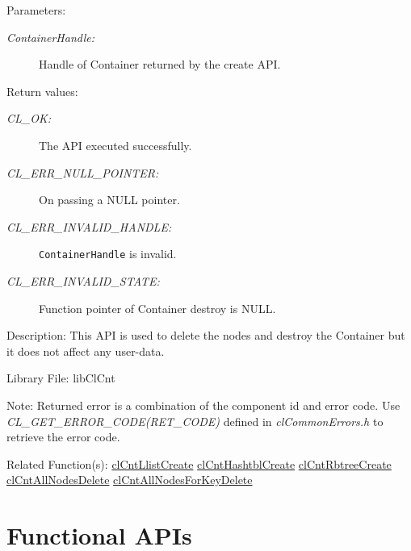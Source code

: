 \begin{Desc}
\item[Parameters:]
\begin{description}
\item[{\em Container\-Handle:}]Handle of Container returned by the create API.\end{description}
\end{Desc}
\begin{Desc}
\item[Return values:]
\begin{description}
\item[{\em CL\_\-OK:}]The API executed successfully. 
\item[{\em CL\_\-ERR\_\-NULL\_\-POINTER:}] On passing a NULL pointer. 
\item[{\em CL\_\-ERR\_\-INVALID\_\-HANDLE:}] {\tt{ContainerHandle}} is invalid.
\item[{\em CL\_\-ERR\_\-INVALID\_\-STATE:}] Function pointer of Container destroy is NULL.
\end{description}
\end{Desc}
\begin{Desc}
\item[Description:]This API is used to delete the nodes and destroy the Container but it does not affect any user-data.\end{Desc}
\begin{Desc}
\item[Library File:]lib\-Cl\-Cnt\end{Desc}
\begin{Desc}
\item[Note:]Returned error is a combination of the component id and error code. Use \textit{CL\_\-GET\_\-ERROR\_\-CODE(RET\_\-CODE)} defined in
\textit{clCommonErrors.h} to retrieve the error code.\end{Desc}
\begin{Desc}
\item[Related Function(s):]\hyperlink{pagecnt101}{cl\-Cnt\-Llist\-Create} \hyperlink{pagecnt102}{cl\-Cnt\-Hashtbl\-Create} 
\hyperlink{pagecnt103}{cl\-Cnt\-Rbtree\-Create} \hyperlink{pagecnt106}{cl\-Cnt\-All\-Nodes\-Delete} 
\hyperlink{pagecnt107}{cl\-Cnt\-All\-Nodes\-For\-Key\-Delete} \end{Desc}

\newpage

\section{Functional APIs}

